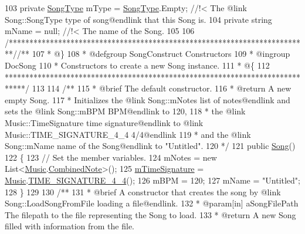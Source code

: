 \begin{DoxyCodeInclude}
103 \textcolor{comment}{}    \textcolor{keyword}{private} \hyperlink{group___song_enums_gae681a1f001333e39fc1cb4fea97bfe1b}{SongType} mType = \hyperlink{group___song_enums_gae681a1f001333e39fc1cb4fea97bfe1b}{SongType}.Empty; \textcolor{comment}{//!< The @link Song::SongType type of
       song@endlink that this Song is.}
104 \textcolor{comment}{}    \textcolor{keyword}{private} \textcolor{keywordtype}{string} mName = null; \textcolor{comment}{//!< The name of the Song.}
105 \textcolor{comment}{}
106     \textcolor{comment}{/*************************************************************************/}\textcolor{comment}{/** }
107 \textcolor{comment}{     * @\}}
108 \textcolor{comment}{     * @defgroup SongConstruct Constructors}
109 \textcolor{comment}{     * @ingroup DocSong}
110 \textcolor{comment}{     * Constructors to create a new Song instance.}
111 \textcolor{comment}{     * @\{}
112 \textcolor{comment}{    *****************************************************************************/}
113 \textcolor{comment}{}
114 \textcolor{comment}{    /**}
115 \textcolor{comment}{     * @brief The default constructor. }
116 \textcolor{comment}{     * @return A new empty Song. }
117 \textcolor{comment}{     * Initializes the @link Song::mNotes list of notes@endlink and sets the @link Song::mBPM BPM@endlink
       to 120, }
118 \textcolor{comment}{     * the @link Music::TimeSignature time signature@endlink to @link Music::TIME\_SIGNATURE\_4\_4 4/4@endlink
       }
119 \textcolor{comment}{     * and the @link Song::mName name of the Song@endlink to "Untitled".}
120 \textcolor{comment}{    */}
121     \textcolor{keyword}{public} \hyperlink{group___song_construct_gae2e6486a6a2f523b7c81de472d761ff5}{Song}()
122     \{
123         \textcolor{comment}{// Set the member variables.}
124         mNotes = \textcolor{keyword}{new} List<\hyperlink{class_music}{Music}.\hyperlink{group___music_structs_struct_music_1_1_combined_note}{CombinedNote}>();
125         \hyperlink{group___song_priv_var_ga2b2dcc0e83e49f7303b6a1371877b25e}{mTimeSignature} = \hyperlink{class_music}{Music}.\hyperlink{group___music_stat_func_gac95af323eef7511543c799154e1c29fd}{TIME\_SIGNATURE\_4\_4}();
126         mBPM = 120;
127         mName = \textcolor{stringliteral}{"Untitled"};
128     \}
129 \textcolor{comment}{}
130 \textcolor{comment}{    /**}
131 \textcolor{comment}{     * @brief A constructor that creates the song by @link Song::LoadSongFromFile loading a file@endlink.}
132 \textcolor{comment}{     * @param[in] aSongFilePath The filepath to the file representing the Song to load.}
133 \textcolor{comment}{     * @return A new Song filled with information from the file.}

\end{DoxyCodeInclude}
